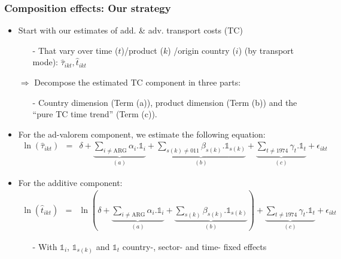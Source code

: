 \documentclass[10 pt,Helvetica, french]{beamer}
\begin{document}
\begin{frame}[label = app_compeffects_strategy]
\frametitle{Composition effects: Our strategy}
\begin{itemize}
\item Start with our estimates of add. \& adv. transport costs (TC)
\begin{itemize}
\footnotesize
\item[-] That vary over time ($t$)/product ($k$) /origin country ($i$) (by transport mode): $\widehat{\tau}_{ikt}, \widehat{t}_{ikt}$ \vspace{0.1cm}
\end{itemize}
\item[$\Rightarrow$] Decompose the estimated TC component in three parts:  \vspace{0.1cm}
\begin{itemize}
\footnotesize
\item[-] Country dimension (Term (a)), product dimension (Term (b)) and the ``pure TC time trend'' (Term (c)).  \vspace{0.1cm}
\end{itemize}
\item For the ad-valorem component, we estimate the following equation:
\footnotesize
\begin{eqnarray}
\ln(\widehat{\tau}_{ikt})&=&\delta +\underbrace{\sum_{i \neq \text{ARG}}\alpha_i.\mathbb{1}_i}_{(a)} + \underbrace{\sum_{s(k)\neq \text{011}}\beta_{s(k)}.\mathbb{1}_{s(k)}}_{(b)} + \underbrace{\sum_{t \neq 1974}\gamma_t.\mathbb{1}_t}_{(c)}+\epsilon_{ikt} \label{eq:compeffects_mult}
\end{eqnarray}
\normalsize
\item For the additive component:
\footnotesize
\begin{eqnarray}
\ln(\widehat{t}_{ikt})&=&\ln\left( \delta + \underbrace{\sum_{i \neq \text{ARG}}  \alpha_i.\mathbb{1}_i}_{(a)}+\underbrace{\sum_{s(k)}\beta_{s(k)}.\mathbb{1}_{s(k)}}_{(b)}\right) + \underbrace{\sum_{t \neq 1974}\gamma_t.\mathbb{1}_t}_{(c)}+\epsilon_{ikt} \label{eq:compeffects_add}
\end{eqnarray}
\normalsize
\begin{itemize}
\item[-] With $\mathbb{1}_i$, $\mathbb{1}_{s(k)}$ and $\mathbb{1}_{t}$ country-, sector- and time- fixed effects \vspace{0.1cm}
\end{itemize}

\end{itemize}
\end{frame}
\end{document}
